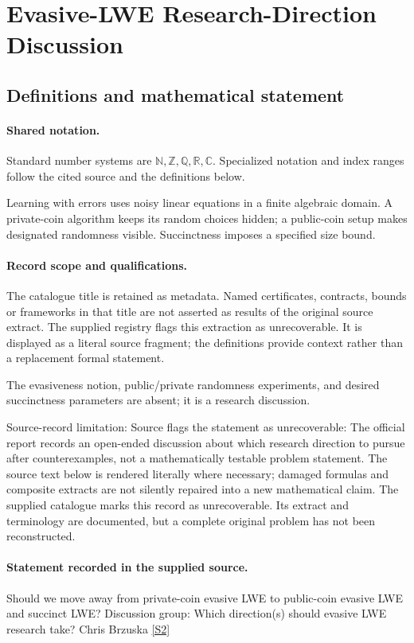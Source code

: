 \documentclass[11pt]{article}
\newcommand{\sref}[2]{\hyperlink{source:#1:#2}{[S#2]}}
\begin{document}
\section{Evasive-LWE Research-Direction Discussion}\label{statement}

\subsection{Definitions and mathematical statement}

\paragraph{Shared notation.}Standard number systems are $\mathbb N,\mathbb Z,\mathbb Q,\mathbb R,\mathbb C$. Specialized notation and index ranges follow the cited source and the definitions below.


Learning with errors uses noisy linear equations in a finite algebraic domain. A private-coin algorithm keeps its random choices hidden; a public-coin setup makes designated randomness visible. Succinctness imposes a specified size bound.
\paragraph{Record scope and qualifications.}
The catalogue title is retained as metadata. Named certificates, contracts, bounds or frameworks in that title are not asserted as results of the original source extract.
The supplied registry flags this extraction as unrecoverable. It is displayed as a literal source fragment; the definitions provide context rather than a replacement formal statement.

The evasiveness notion, public/private randomness experiments, and desired succinctness parameters are absent; it is a research discussion.

Source-record limitation: Source flags the statement as unrecoverable: The official report records an open-ended discussion about which research direction to pursue after counterexamples, not a mathematically testable problem statement.
The source text below is rendered literally where necessary; damaged formulas and composite extracts are not silently repaired into a new mathematical claim.
The supplied catalogue marks this record as unrecoverable. Its extract and terminology are documented, but a complete original problem has not been reconstructed.
\paragraph{Statement recorded in the supplied source.}
Should we move away from private-coin evasive LWE to public-coin evasive LWE and succinct LWE? Discussion group: Which direction(s) should evasive LWE research take? Chris Brzuska \sref{statement}{2}
\end{document}
